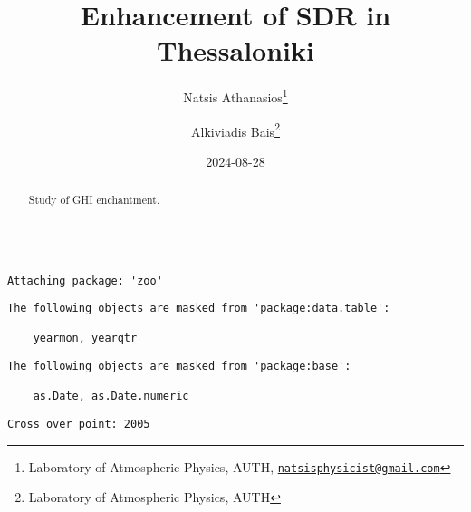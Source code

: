 \documentclass[
  10pt,
  a4paper,oneside]{article}
\title{Enhancement of SDR in Thessaloniki}
\author{Natsis Athanasios\footnote{Laboratory of Atmospheric Physics, AUTH, \href{mailto:natsisphysicist@gmail.com}{\nolinkurl{natsisphysicist@gmail.com}}} \and Alkiviadis Bais\footnote{Laboratory of Atmospheric Physics, AUTH}}
\date{2024-08-28}
\begin{document}
\maketitle
\begin{abstract}
Study of GHI enchantment.
\end{abstract}

{
\hypersetup{linkcolor=}
\setcounter{tocdepth}{4}
\tableofcontents
}
\begin{verbatim}

Attaching package: 'zoo'
\end{verbatim}

\begin{verbatim}
The following objects are masked from 'package:data.table':

    yearmon, yearqtr
\end{verbatim}

\begin{verbatim}
The following objects are masked from 'package:base':

    as.Date, as.Date.numeric
\end{verbatim}

\begin{verbatim}
Cross over point: 2005 
\end{verbatim}
\end{document}
